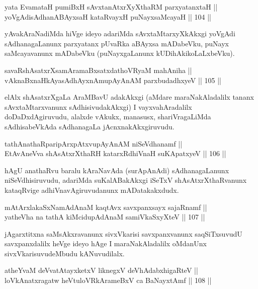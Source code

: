 \begin{shl}
yata EvamataH pumiBxH sAvxtanAtxrXyXthaRM parxyatanxtaH ||  \\
yoVgAdisAdhanABAyxsaH kataRvayxH puNayxsaMcayaH \hfill || 104 ||  
\end{shl}

\begin{artha}
yAvakAraNadiMda hiVge ideyo adariMda sAvxtaMtarxyXkAkxgi yoVgAdi
sAdhanagaLanunx parxyatanx pUvaRka aBAyxsa mADabeVku, puNayx
saMcayavanunx mADabeVku (puNayxgaLanunx kUDihAkikoLaLxbeVku).
\end{artha}

\begin{shl}
savaRshAsatxrXsamAramaBxsatxdathoVR\s yaM mahAniha || \\
vAknaBxnaHkAyasAdhAyxnAmupAyAnAM parxbudadhxyeV \hfill || 105 ||  
\end{shl}

\begin{artha}
elAlx shAsatxrXgaLa AraMBavU adakAkxgi (aMdare maraNakAladalilx tananx
sAvxtaMtarxvanunx sAdhisivudakAkxgi) I vayxvahAradalilx
doDaDxdAgiruvudu, alalxde vAkukx, manasusx, shariVragaLiMda
sAdhisabeVkAda sAdhanagaLa jAcnxnakAkxgiruvudu.
\end{artha}

\begin{shl}
tathA\s nathaRparipArxpAtxvupAyAnAM niSeVdhanamf || \\
EtAvAneVva shAsAtxrXthaRH katarxRdhiVnaH suKApatxyeV \hfill || 106 ||  
\end{shl}

\begin{artha}
hAgU anathaRvu baralu kAraNavAda (surApAnAdi) sAdhanagaLanunx
niSeVdhisiruvudu, adariMda suKalABakAkxgi iSeTxV shAsAtxrXthaRvanunx
kataqRvige adhiVnavAgiruvudanunx mADatakakxdudx.
\end{artha}

\begin{shl}
mAtArxlakaSxNamAdAnaM kaqtAvx savxpanxsayx sajaRnamf ||  \\
yatheVha na tathA kiMcidupAdAnaM samiVkaSxyXteV \hfill || 107 ||  
\end{shl}

\begin{artha}
jAgarxtitxna saMsAkxravanunx sivxVkarisi savxpanxvanunx saqSiTxsuvudU
savxpanxdalilx heVge ideyo hAge I maraNakAladalilx oMdanUnx
sivxVkarisuvudeMbudu kANuvudilalx.
\end{artha}

\begin{shl}
atheYvaM deVvatAtayxketxV liknegxV deVhAdabxhigaRteV || \\
loVkAnatxragatw heVtuloVRkArameBxV ca BaNayxtAmf \hfill || 108 ||  
\end{shl}

